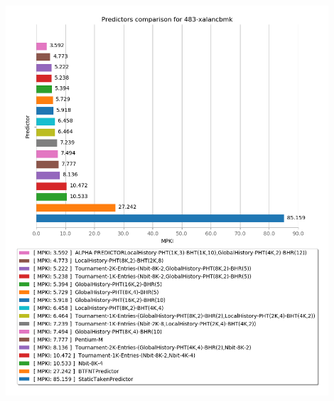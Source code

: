    \begin{minipage}{\textwidth}
      \begin{center}
         \\
         \vspace{3mm}
         \includegraphics[width=0.9\textwidth, frame]{./graphs/4-5/483-xalancbmk.png}
         \vspace{6mm}
      \end{center}
   \end{minipage}


